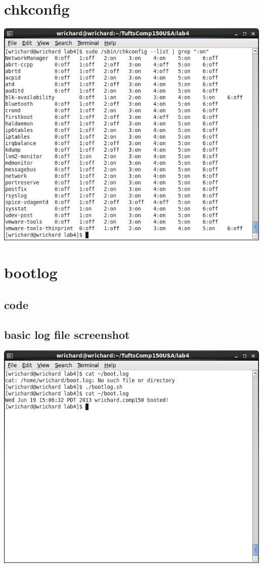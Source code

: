 \documentclass[a4paper,10pt]{article}
\begin{document}
\section{chkconfig}
  \begin{center}
  \includegraphics[width=\linewidth]{./chkconfig.png}
  \end{center}

\section{bootlog}
\subsection{code}

\subsection{basic log file screenshot}
  \begin{center}
  \includegraphics[width=\linewidth]{./bootlog.png}
  \end{center}
\end{document}
